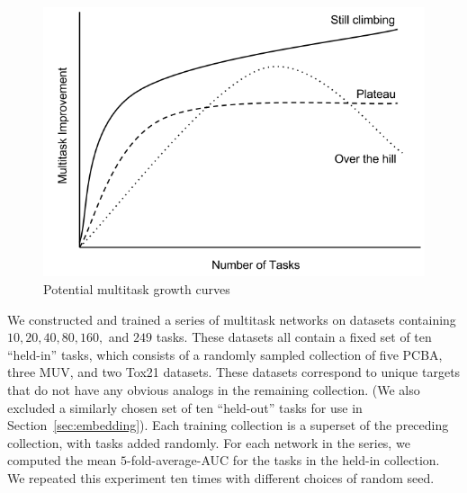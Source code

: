 \begin{figure}[ht]
\vskip 0.2in
\begin{center}
\centerline{\includegraphics[width=0.7\linewidth]{Images/curves.png}}
\caption{Potential multitask growth curves}
\label{fig:growth_held_in}
\end{center}
\vskip -0.2in
\end{figure}

We constructed and trained a series of multitask networks on datasets
containing $10, 20, 40, 80, 160,$ and $249$ tasks. These datasets all
contain a fixed set of ten ``held-in'' tasks, which consists of a randomly
sampled collection of five PCBA, three MUV, and two Tox21 datasets.  These
datasets correspond to unique targets that do not have any obvious analogs
in the remaining collection. (We also excluded a similarly chosen set of
ten ``held-out'' tasks for use in Section~\ref{sec:embedding}). Each
training collection is a superset of the preceding collection, with tasks
added randomly. For each network in the series, we computed the mean
$5$-fold-average-AUC for the tasks in the held-in collection. We repeated
this experiment ten times with different choices of random seed.

